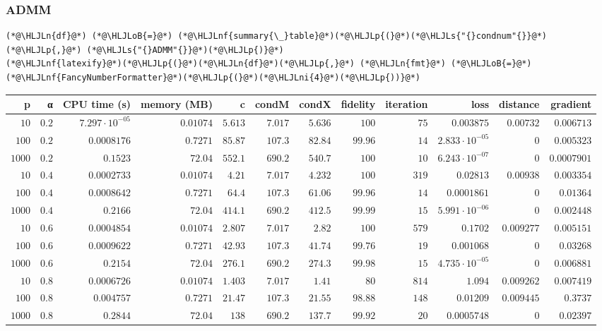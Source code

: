 \documentclass[12pt,a4paper]{article}
\newcommand{\HLJLn}[1]{#1}
\newcommand{\HLJLnf}[1]{\textcolor[RGB]{66,102,213}{#1}}
\newcommand{\HLJLs}[1]{\textcolor[RGB]{201,61,57}{#1}}
\newcommand{\HLJLni}[1]{\textcolor[RGB]{59,151,46}{#1}}
\newcommand{\HLJLoB}[1]{\textcolor[RGB]{102,102,102}{\textbf{#1}}}
\newcommand{\HLJLp}[1]{#1}
\begin{document}
\subsubsection{ADMM}

\begin{lstlisting}
(*@\HLJLn{df}@*) (*@\HLJLoB{=}@*) (*@\HLJLnf{summary{\_}table}@*)(*@\HLJLp{(}@*)(*@\HLJLs{"{}condnum"{}}@*)(*@\HLJLp{,}@*) (*@\HLJLs{"{}ADMM"{}}@*)(*@\HLJLp{)}@*)
(*@\HLJLnf{latexify}@*)(*@\HLJLp{(}@*)(*@\HLJLn{df}@*)(*@\HLJLp{,}@*) (*@\HLJLn{fmt}@*) (*@\HLJLoB{=}@*) (*@\HLJLnf{FancyNumberFormatter}@*)(*@\HLJLp{(}@*)(*@\HLJLni{4}@*)(*@\HLJLp{))}@*)
\end{lstlisting}


\begin{tabular}
{r | r | r | r | r | r | r | r | r | r | r | r}
p & α & CPU time (s) & memory (MB) & c & condM & condX & fidelity & iteration & loss & distance & gradient \\
\hline
$10$ & $0.2$ & $7.297 \cdot 10^{-05}$ & $0.01074$ & $5.613$ & $7.017$ & $5.636$ & $100$ & $75$ & $0.003875$ & $0.00732$ & $0.006713$ \\
$100$ & $0.2$ & $0.0008176$ & $0.7271$ & $85.87$ & $107.3$ & $82.84$ & $99.96$ & $14$ & $2.833 \cdot 10^{-05}$ & $0$ & $0.005323$ \\
$1000$ & $0.2$ & $0.1523$ & $72.04$ & $552.1$ & $690.2$ & $540.7$ & $100$ & $10$ & $6.243 \cdot 10^{-07}$ & $0$ & $0.0007901$ \\
$10$ & $0.4$ & $0.0002733$ & $0.01074$ & $4.21$ & $7.017$ & $4.232$ & $100$ & $319$ & $0.02813$ & $0.00938$ & $0.003354$ \\
$100$ & $0.4$ & $0.0008642$ & $0.7271$ & $64.4$ & $107.3$ & $61.06$ & $99.96$ & $14$ & $0.0001861$ & $0$ & $0.01364$ \\
$1000$ & $0.4$ & $0.2166$ & $72.04$ & $414.1$ & $690.2$ & $412.5$ & $99.99$ & $15$ & $5.991 \cdot 10^{-06}$ & $0$ & $0.002448$ \\
$10$ & $0.6$ & $0.0004854$ & $0.01074$ & $2.807$ & $7.017$ & $2.82$ & $100$ & $579$ & $0.1702$ & $0.009277$ & $0.005151$ \\
$100$ & $0.6$ & $0.0009622$ & $0.7271$ & $42.93$ & $107.3$ & $41.74$ & $99.76$ & $19$ & $0.001068$ & $0$ & $0.03268$ \\
$1000$ & $0.6$ & $0.2154$ & $72.04$ & $276.1$ & $690.2$ & $274.3$ & $99.98$ & $15$ & $4.735 \cdot 10^{-05}$ & $0$ & $0.006881$ \\
$10$ & $0.8$ & $0.0006726$ & $0.01074$ & $1.403$ & $7.017$ & $1.41$ & $80$ & $814$ & $1.094$ & $0.009262$ & $0.007419$ \\
$100$ & $0.8$ & $0.004757$ & $0.7271$ & $21.47$ & $107.3$ & $21.55$ & $98.88$ & $148$ & $0.01209$ & $0.009445$ & $0.3737$ \\
$1000$ & $0.8$ & $0.2844$ & $72.04$ & $138$ & $690.2$ & $137.7$ & $99.92$ & $20$ & $0.0005748$ & $0$ & $0.02397$ \\
\end{tabular}
\end{document}
